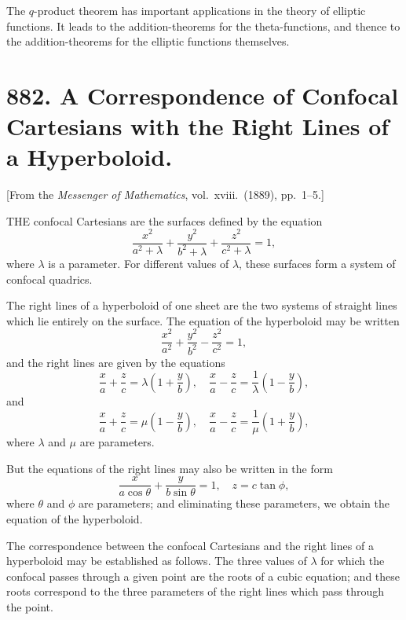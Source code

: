 \documentclass[11pt,a4paper]{book}
\begin{document}
\medskip\noindent
The $q$-product theorem has important applications in the theory of elliptic functions. It leads to the addition-theorems for the theta-functions, and thence to the addition-theorems for the elliptic functions themselves.

\newpage
\section[882]{882. A Correspondence of Confocal Cartesians with the Right Lines of a Hyperboloid.}
\label{sec:882}

[From the \textit{Messenger of Mathematics}, vol.\ xviii.\ (1889), pp.\ 1--5.]

\medskip\noindent
THE confocal Cartesians are the surfaces defined by the equation
\[
\frac{x^{2}}{a^{2} + \lambda} + \frac{y^{2}}{b^{2} + \lambda} + \frac{z^{2}}{c^{2} + \lambda} = 1,
\]
where $\lambda$ is a parameter. For different values of $\lambda$, these surfaces form a system of confocal quadrics.

\medskip\noindent
The right lines of a hyperboloid of one sheet are the two systems of straight lines which lie entirely on the surface. The equation of the hyperboloid may be written
\[
\frac{x^{2}}{a^{2}} + \frac{y^{2}}{b^{2}} - \frac{z^{2}}{c^{2}} = 1,
\]
and the right lines are given by the equations
\[
\frac{x}{a} + \frac{z}{c} = \lambda\left(1 + \frac{y}{b}\right), \quad
\frac{x}{a} - \frac{z}{c} = \frac{1}{\lambda}\left(1 - \frac{y}{b}\right),
\]
and
\[
\frac{x}{a} + \frac{z}{c} = \mu\left(1 - \frac{y}{b}\right), \quad
\frac{x}{a} - \frac{z}{c} = \frac{1}{\mu}\left(1 + \frac{y}{b}\right),
\]
where $\lambda$ and $\mu$ are parameters.

\medskip\noindent
But the equations of the right lines may also be written in the form
\[
\frac{x}{a\cos\theta} + \frac{y}{b\sin\theta} = 1, \quad z = c\tan\phi,
\]
where $\theta$ and $\phi$ are parameters; and eliminating these parameters, we obtain the equation of the hyperboloid.

\medskip\noindent
The correspondence between the confocal Cartesians and the right lines of a hyperboloid may be established as follows. The three values of $\lambda$ for which the confocal passes through a given point are the roots of a cubic equation; and these roots correspond to the three parameters of the right lines which pass through the point.
\end{document}
